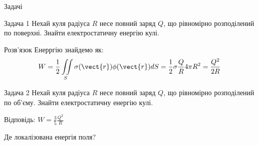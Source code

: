 \documentclass[onlytextwidth]{beamer}
\begin{document}
\begin{frame}{Задачі}{}
	\begin{exampleblock}{\scriptsize Задача 1}\justifying\scriptsize
		Нехай куля радіуса $R$ несе повний заряд $Q$, що рівномірно розподілений по поверхні.
		Знайти електростатичну енергію кулі.
	\end{exampleblock}
	\begin{block}{\scriptsize Розв'язок}\justifying\scriptsize
		Енерргію знайдемо як:
		\begin{equation*}
			W =  \frac12 \iint\limits_S \sigma(\vect{r})\phi(\vect{r}) dS =
			\frac12\sigma\frac{Q}{R}4\pi
			R^2 = \frac{Q^2}{2R}
		\end{equation*}
	\end{block}

	\begin{exampleblock}{\scriptsize Задача 2}\justifying\scriptsize
		Нехай куля радіуса $R$ несе повний заряд $Q$, що рівномірно розподілений по об'єму.
		Знайти електростатичну енергію кулі.

		\bigskip

		Відповідь: $W = \frac35 \frac{Q^2}{R}$
	\end{exampleblock}

	\begin{alertblock}{}\centering
		Де локалізована енергія поля?
	\end{alertblock}
\end{frame}
\end{document}
